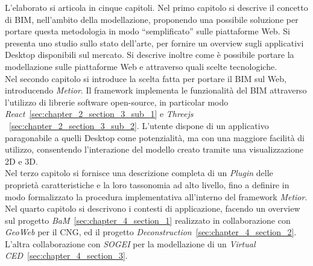 L'elaborato si articola in cinque capitoli.
Nel primo capitolo si descrive il concetto di BIM, nell’ambito della modellazione, proponendo una possibile soluzione
per portare questa metodologia in modo ``semplificato'' sulle piattaforme Web.
Si presenta uno studio sullo stato dell’arte, per fornire un overview
sugli applicativi Desktop disponibili sul mercato. Si descrive inoltre come è
possibile portare la modellazione sulle piattaforme Web e attraverso quali scelte tecnologiche.\\
Nel secondo capitolo si introduce la scelta fatta per portare il BIM sul Web, introducendo \emph{Metior}.
Il framework implementa le funzionalità del BIM attraverso l'utilizzo di librerie software open-source,
in particolar modo \emph{React}~\ref{sec:chapter_2_section_3_sub_1} e \emph{Threejs} ~\ref{sec:chapter_2_section_3_sub_2}.
L'utente dispone di un applicativo paragonabile a quelli
Desktop come potenzialità, ma con una maggiore facilità di utilizzo, consentendo l'interazione del modello creato
tramite una visualizzazione 2D e 3D.\\
Nel terzo capitolo si fornisce una descrizione completa di un \emph{Plugin} delle
proprietà caratteristiche e la loro tassonomia ad alto livello, fino a definire in modo formalizzato
la procedura implementativa all'interno del framework \emph{Metior}.\\
Nel quarto capitolo si descrivono i contesti di applicazione, facendo un overview sul
progetto \emph{BaM}~\ref{sec:chapter_4_section_1} realizzato in collaborazione con \emph{GeoWeb} per il CNG,
ed il progetto \emph{Deconstruction}~\ref{sec:chapter_4_section_2}.
L'altra collaborazione con \emph{SOGEI} per la modellazione di un \emph{Virtual CED}~\ref{sec:chapter_4_section_3}.
